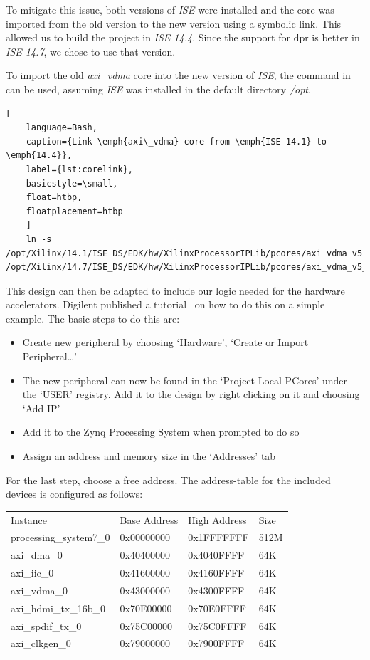 To mitigate this issue, both versions of \emph{ISE} were installed and the core
was imported from the old version to the new version using a symbolic link.
This allowed us to build the project in \emph{ISE 14.4}.
Since the support for \gls{dpr} is better in \emph{ISE 14.7}, we chose to use
that version.

To import the old \emph{axi\_vdma} core into the new version of \emph{ISE}, the
command in  can be used, assuming \emph{ISE} was installed in
the default directory \emph{/opt}.
\begin{lstlisting}[
	language=Bash,
	caption={Link \emph{axi\_vdma} core from \emph{ISE 14.1} to \emph{14.4}},
	label={lst:corelink},
	basicstyle=\small,
	float=htbp,
	floatplacement=htbp
	]
	ln -s /opt/Xilinx/14.1/ISE_DS/EDK/hw/XilinxProcessorIPLib/pcores/axi_vdma_v5_01_a /opt/Xilinx/14.7/ISE_DS/EDK/hw/XilinxProcessorIPLib/pcores/axi_vdma_v5_01_a
\end{lstlisting}

This design can then be adapted to include our logic needed for the hardware
accelerators.
Digilent published a tutorial~\cite{DigilentTutorial} on how to do this on a
simple example.
The basic steps to do this are:
\begin{itemize}
	\item Create new peripheral by choosing `Hardware', `Create or Import
		Peripheral\ldots'
	\item The new peripheral can now be found in the `Project Local PCores'
		under the `USER' registry.
		Add it to the design by right clicking on it and choosing `Add IP'
	\item Add it to the Zynq Processing System when prompted to do so
	\item Assign an address and memory size in the `Addresses' tab
\end{itemize}
For the last step, choose a free address.
The address-table for the included devices is configured as follows:

\begin{tabular}{llll}
	Instance                & Base Address & High Address & Size\\
	processing\_system7\_0  & 0x00000000   & 0x1FFFFFFF   & 512M\\
	axi\_dma\_0             & 0x40400000   & 0x4040FFFF   & 64K\\
	axi\_iic\_0             & 0x41600000   & 0x4160FFFF   & 64K\\
	axi\_vdma\_0            & 0x43000000   & 0x4300FFFF   & 64K\\
	axi\_hdmi\_tx\_16b\_0   & 0x70E00000   & 0x70E0FFFF   & 64K\\
	axi\_spdif\_tx\_0       & 0x75C00000   & 0x75C0FFFF   & 64K\\
	axi\_clkgen\_0          & 0x79000000   & 0x7900FFFF   & 64K
\end{tabular}

